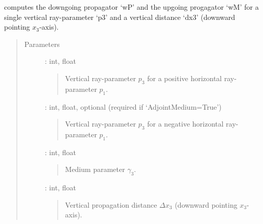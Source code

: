 \documentclass[letterpaper,10pt,english]{sphinxmanual}
\begin{document}
\begin{fulllineitems}
\begin{fulllineitems}
%
\begin{sphinxVerbatim}[commandchars=\\\{\}]
\end{sphinxVerbatim}

\end{fulllineitems}


\begin{fulllineitems}
\label{\detokenize{Layered_NRM_p_w:Layered_NRM_p_w.Layered_NRM_p_w.W_propagators_p_w}}
computes the downgoing propagator ‘wP’ and the upgoing progagator ‘wM’ for a single vertical ray-parameter ‘p3’ and a vertical distance ‘dx3’ (downward pointing \(x_3\)-axis).
\begin{quote}\begin{description}
\item[{Parameters}] \leavevmode
{} : int, float
\begin{quote}

Vertical ray-parameter \(p_3\) for a positive horizontal ray-parameter \(p_1\).
\end{quote}

 : int, float, optional (required if ‘AdjointMedium=True’)
\begin{quote}

Vertical ray-parameter \(p_3\) for a negative horizontal ray-parameter \(p_1\).
\end{quote}

 : int, float
\begin{quote}

Medium parameter \(\gamma_3\).
\end{quote}

 : int, float
\begin{quote}

Vertical propagation distance \(\Delta x_3\) (downward pointing \(x_3\)-axis).
\end{quote}


\end{description}
\end{quote}
\end{fulllineitems}
\end{fulllineitems}
\end{document}
